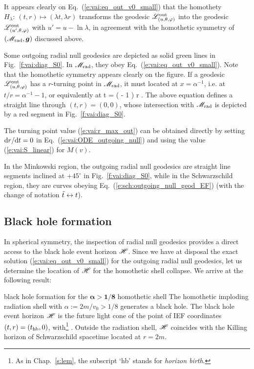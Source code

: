 It appears clearly on Eq.~(\ref{e:vai:eq_out_v0_small}) that
the homothety $H_\lambda:\ (t, r) \mapsto (\lambda t, \lambda r)$
transforms the geodesic $\mathscr{L}_{(u,\theta,\varphi)}^{\rm out}$  into the geodesic
$\mathscr{L}_{(u',\theta,\varphi)}^{\rm out}$ with $u' = u - \ln \lambda$,
in agreement with the homothetic symmetry of $(\mathscr{M}_{\rm rad}, \bm{g})$ discussed
above.

Some outgoing radial null geodesics are depicted as solid green lines
in Fig.~\ref{f:vai:diag_S0}. In $\mathscr{M}_{\rm rad}$, they obey
Eq.~(\ref{e:vai:eq_out_v0_small}).
Note that the homothetic symmetry appears clearly on the figure.
If a geodesic $\mathscr{L}_{(u,\theta,\varphi)}^{\rm out}$  has a $r$-turning point in $\mathscr{M}_{\rm rad}$,
it must located at $x = \alpha^{-1}$, i.e. at $t/r = \alpha^{-1} - 1$,
or equivalently at
\be \label{e:vai:r_max_out}
  t = \left(  - 1 \right) r .
\ee
The above equation defines a straight line through $(t,r) = (0,0)$,
whose intersection with $\mathscr{M}_{\rm rad}$ is depicted by a red segment
in Fig.~\ref{f:vai:diag_S0}.
\begin{remark}
The turning point value (\ref{e:vai:r_max_out}) can be obtained
directly by setting $\mathrm{d} r / \mathrm{d} t = 0$ in Eq.~(\ref{e:vai:ODE_outgoing_null})
and using the value (\ref{e:vai:S_linear}) for $M(v)$.
\end{remark}

In the Minkowski region, the outgoing radial null geodesics are straight line
segments inclined at $+45^\circ$ in Fig.~\ref{f:vai:diag_S0}, while
in the Schwarzschild region, they are curves obeying Eq.~(\ref{e:sch:outgoing_null_geod_EF})
(with the change of notation ${\tilde t} \leftrightarrow t$).


\subsection{Black hole formation} \label{s:vai:BH_formation}

In spherical symmetry, the inspection of radial null geodesics provides
a direct access to the black hole event horizon $\mathscr{H}$.
Since we have at disposal the exact solution
(\ref{e:vai:eq_out_v0_small}) for the outgoing radial null geodesics,
let us determine the location of $\mathscr{H}$ for the homothetic
shell collapse.
We arrive at the following result:
\begin{tprop}{black hole formation for the $\bm{\alpha > 1/8}$ homothetic shell}{}
The homothetic imploding radiation shell with $\alpha := 2m/v_0 > 1/8$
generates a black hole. The black hole event horizon $\mathscr{H}$
is the future light cone of the point of IEF coordinates
$(t, r) = (t_{\rm hb}, 0)$, with\footnote{As in Chap.~\ref{s:lem}, the subscript `hb' stands
for \emph{horizon birth}.}
\be \label{e:vai:t_hb}
     .
\ee
Outside the radiation shell, $\mathscr{H}$ coincides with the
Killing horizon of Schwarzschild spacetime located at $r=2m$.
\end{tprop}

